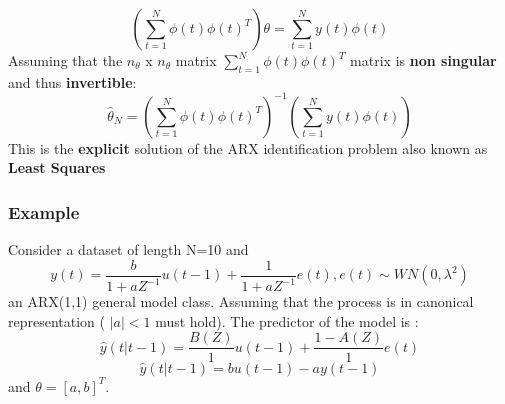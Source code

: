 $$ (\sum\limits_{t=1}^{N} \phi(t)\phi(t)^T)\theta = \sum\limits_{t=1}^{N} y(t) \phi
(t)$$
Assuming that the $n_{\theta} $ x $ n_{\theta} $ matrix $\sum\limits_{t=1}^{N}\phi(t)\phi(t)^T$ matrix is \textbf{non singular } and thus \textbf{invertible}:
\[
\boxed{\hat{\theta}_N= (\sum\limits_{t=1}^{N}\phi(t)\phi(t)^T)^{-1}(\sum\limits_{t=1}^{N}y(t)\phi(t))}
\] 
This is the \textbf{explicit} solution of the ARX identification problem also known as \textbf{Least Squares}

\subsubsection{Example}
Consider a dataset of length N=10 and 
$$ y(t) = \frac{b}{1+aZ^{-1}}u(t-1)+\frac{1}{1+aZ^{-1}}e(t), e(t) \sim WN(0,\lambda^2)$$
an ARX(1,1) general model class.
Assuming that the process is in canonical representation ( $|a|<1$ must hold).
The predictor of the model is :
$$ \hat{y}(t|t-1)= \frac{B(Z)}{1}u(t-1)+\frac{1-A(Z)}{1}e(t)$$
\[
\boxed{\hat{y}(t|t-1)=bu(t-1)-ay(t-1)}
\]
and $\theta= [a,b]^T$.\\
